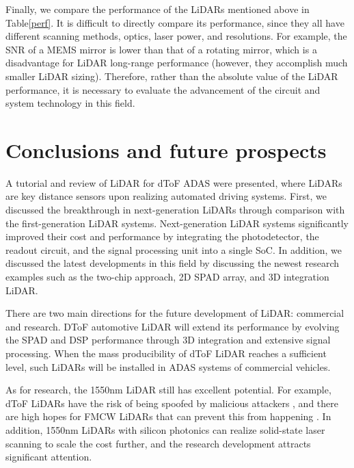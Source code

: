 \documentclass[paper]{ieice}
\begin{document}
Finally, we compare the performance of the LiDARs mentioned above in Table\ref{perf}. It is difficult to directly compare its performance, since they all have different scanning methods, optics, laser power, and resolutions. For example, the SNR of a MEMS mirror is lower than that of a rotating mirror, which is a disadvantage for LiDAR long-range performance (however, they accomplish much smaller LiDAR sizing). Therefore, rather than the absolute value of the LiDAR performance, it is necessary to evaluate the advancement of the circuit and system technology in this field.

\section{Conclusions and future prospects}
\qquad A tutorial and review of LiDAR for dToF ADAS were presented, where LiDARs are key distance sensors upon realizing automated driving systems. First, we discussed the breakthrough in next-generation LiDARs through comparison with the first-generation LiDAR systems. Next-generation LiDAR systems significantly improved their cost and performance by integrating the photodetector, the readout circuit, and the signal processing unit into a single SoC.
In addition, we discussed the latest developments in this field by discussing the newest research examples such as the two-chip approach, 2D SPAD array, and 3D integration LiDAR.

There are two main directions for the future development of LiDAR: commercial and research. DToF automotive LiDAR will extend its performance by evolving the SPAD and DSP performance through 3D integration and extensive signal processing. When the mass producibility of dToF LiDAR reaches a sufficient level, such LiDARs will be installed in ADAS systems of commercial vehicles.

As for research, the 1550nm LiDAR still has excellent potential. For example, dToF LiDARs have the risk of being spoofed by malicious attackers \cite{sun2020towards, cao2019adversarial}, and there are high hopes for FMCW LiDARs that can prevent this from happening \cite{aptivpatent}. In addition, 1550nm LiDARs with silicon photonics can realize solid-state laser scanning to scale the cost further, and the research development attracts significant attention\cite{poulton2017coherent}.

\end{document}
